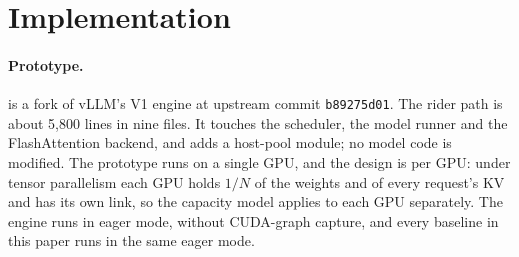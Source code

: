 
\section{Implementation}\label{sec:impl}

\paragraph{Prototype.} \sysname{} is a fork of vLLM's V1 engine at upstream
commit \texttt{b89275d01}. The rider path is about 5{,}800 lines in nine
files. It touches the scheduler, the model runner and the FlashAttention
backend, and adds a host-pool module; no model code is modified. The prototype
runs on a single GPU, and the design is per GPU: under tensor parallelism each
GPU holds $1/N$ of the weights and of every request's KV and has its own link,
so the capacity model applies to each GPU separately. The engine runs in eager
mode, without CUDA-graph capture, and every baseline in this paper runs in the
same eager mode.

